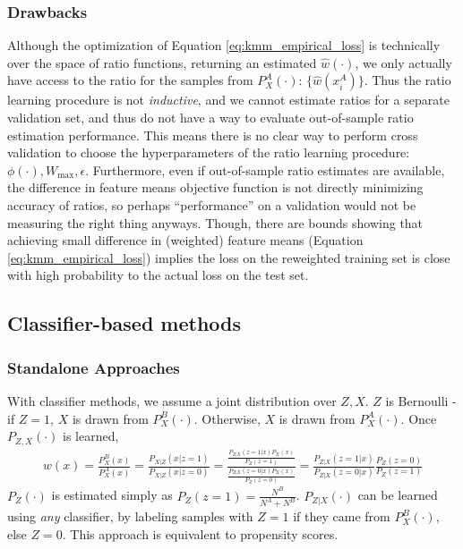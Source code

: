 \documentclass[8pt]{article}
\begin{document}
\subsubsection{Drawbacks}
Although the optimization of Equation \ref{eq:kmm_empirical_loss} is
technically over the space of ratio functions, returning an
estimated $\hat{w}(\cdot)$, we only actually have
access to the ratio for the samples from $P_X^A(\cdot)$:
$\{\hat{w}(x_i^A)\}$.  Thus the ratio learning procedure is not
\emph{inductive}, and we cannot estimate ratios for a separate
validation set, and thus do not have a way to evaluate out-of-sample
ratio estimation performance.  This means there is no clear way to
perform cross validation to choose the hyperparameters of the ratio
learning procedure: $\phi(\cdot),W_{\max},\epsilon$.  Furthermore,
even if out-of-sample ratio estimates are available, the difference in
feature means objective function is not directly minimizing accuracy
of ratios, so perhaps ``performance'' on a validation would not be
measuring the right thing anyways.  Though, there are bounds showing that achieving small difference in (weighted)
feature means (Equation \ref{eq:kmm_empirical_loss}) implies the loss
on the reweighted training set is close with high probability to the
actual loss on the test set.
\subsection{Classifier-based methods}
\subsubsection{Standalone Approaches}
With classifier methods, we assume a joint distribution over $Z,X$.
$Z$ is Bernoulli - if $Z=1$, $X$ is drawn from $P_X^B(\cdot)$.
Otherwise, $X$ is drawn from $P_X^A(\cdot)$.  Once $P_{Z,X}(\cdot)$ is
learned, 
\begin{align}
w(x) = \frac{P_X^B(x)}{P_X^A(x)} = \frac{P_{X|Z}(x|z=1)
}{P_{X|Z}(x|z=0) } =
\frac{\tfrac{P_{Z|X}(z=1|x)P_X(x)}{P_Z(z=1)}}{\tfrac{P_{Z|X}(z=0|x)P_X(x)}{P_Z(z=0)}}
= \frac{P_{Z|X}(z=1|x)}{P_{Z|X}(z=0|x)} \frac{P_Z(z=0)}{P_Z(z=1)}\label{eq:classifier_ratio}
\end{align}
$P_Z(\cdot)$ is estimated simply as $P_Z(z=1) =
\tfrac{N^B}{N^A+N^B}$.  $P_{Z|X}(\cdot)$ can be learned using
\emph{any} classifier, by labeling samples with $Z=1$ if they came
from $P_X^B(\cdot)$, else $Z=0$.  This approach is equivalent
to propensity scores.
\end{document}
